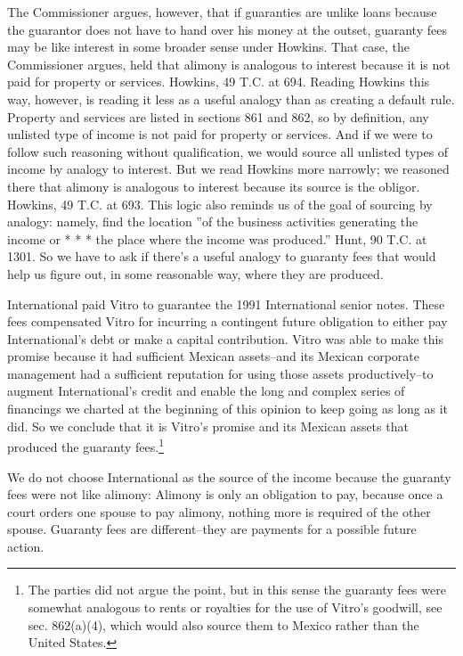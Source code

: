 \begin{select}
The Commissioner argues, however, that if guaranties are unlike loans because the guarantor does not have to hand over his money at the outset, guaranty fees may be like interest in some broader sense under Howkins. That case, the Commissioner argues, held that alimony is analogous to interest because it is not paid for property or services. Howkins, 49 T.C. at 694. Reading Howkins this way, however, is reading it less as a useful analogy than as creating a default rule. Property and services are listed in sections 861 and 862, so by definition, any unlisted type of income is not paid for property or services. And if we were to follow such reasoning without qualification, we would source all unlisted types of income by analogy to interest. But we read Howkins more narrowly; we reasoned there that alimony is analogous to interest because its source is the obligor. Howkins, 49 T.C. at 693. This logic also reminds us of the goal of sourcing by analogy: namely, find the location ''of the business activities generating the income or * * * the place where the income was produced.'' Hunt, 90 T.C. at 1301. So we have to ask if there's a useful analogy to guaranty fees that would help us figure out, in some reasonable way, where they are produced.


International paid Vitro to guarantee the 1991 International senior notes. These fees compensated Vitro for incurring a contingent future obligation to either pay International's debt or make a capital contribution. Vitro was able to make this promise because it had sufficient Mexican assets--and its Mexican corporate management had a sufficient reputation for using those assets productively--to augment International's credit and enable the long and complex series of financings we charted at the beginning of this opinion to keep going as long as it did. So we conclude that it is Vitro's promise and its Mexican assets that produced the guaranty fees.\footnote[19]{The parties did not argue the point, but in this sense the guaranty fees were somewhat analogous to rents or royalties for the use of Vitro's goodwill, see sec. 862(a)(4), which would also source them to Mexico rather than the United States.}

We do not choose International as the source of the income because the guaranty fees were not like alimony: Alimony is only an obligation to pay, because once a court orders one spouse to pay alimony, nothing more is required of the other spouse. Guaranty fees are different--they are payments for a possible future action.


\end{select}
